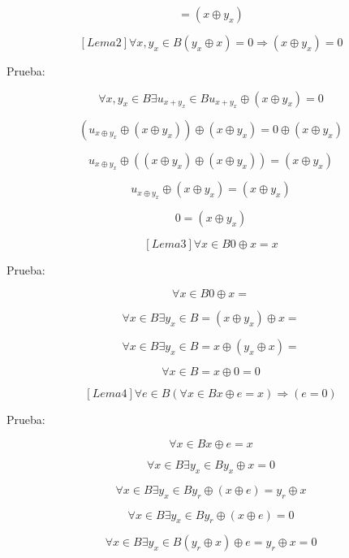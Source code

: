 \documentclass[
]{article}
\begin{document}
\begin{enumerate}
\begin{enumerate}
\begin{enumerate}
      \[= \left( {x \oplus y_{x}} \right)\]

      \[\left\lbrack {{Lema}2} \right\rbrack\forall x,{y_{x} \in B}{\left( {y_{x} \oplus x} \right) = 0}\Rightarrow{\left( {x \oplus y_{x}} \right) = 0}\]

      Prueba:

      \[\forall x,{y_{x} \in B}\exists{u_{x + y_{x}} \in B}{{u_{x + y_{x}} \oplus \left( {x \oplus y_{x}} \right)} = 0}\]

      \[\left( {u_{x \oplus y_{x}} \oplus \left( {x \oplus y_{x}} \right)} \right) \oplus {\left( {x \oplus y_{x}} \right) = 0} \oplus \left( {x \oplus y_{x}} \right)\]

      \[u_{x \oplus y_{x}} \oplus {\left( {\left( {x \oplus y_{x}} \right) \oplus \left( {x \oplus y_{x}} \right)} \right) = \left( {x \oplus y_{x}} \right)}\]

      \[u_{x \oplus y_{x}} \oplus {\left( {x \oplus y_{x}} \right) = \left( {x \oplus y_{x}} \right)}\]

      \[0 = \left( {x \oplus y_{x}} \right)\]

      \[\left\lbrack {{Lema}3} \right\rbrack\forall{x \in B}0 \oplus {x = x}\]

      Prueba:

      \[\forall{x \in B}0 \oplus {x =}\]

      \[\forall{x \in B}\exists{y_{x} \in B}{= \left( {x \oplus y_{x}} \right)} \oplus {x =}\]

      \[\forall{x \in B}\exists{y_{x} \in B}{= x} \oplus {\left( {y_{x} \oplus x} \right) =}\]

      \[\forall{x \in B}{= x} \oplus {0 = 0}\]

      \[\left\lbrack {{Lema}4} \right\rbrack\forall{e \in B}\left( {\forall{x \in B}x \oplus {e = x}} \right)\Rightarrow\left( {e = 0} \right)\]

      Prueba:

      \[\forall{x \in B}x \oplus {e = x}\]

      \[\forall{x \in B}\exists{y_{x} \in B}y_{x} \oplus {x = 0}\]

      \[\forall{x \in B}\exists{y_{x} \in B}y_{r} \oplus {\left( {x \oplus e} \right) = y_{r}} \oplus x\]

      \[\forall{x \in B}\exists{y_{x} \in B}y_{r} \oplus {\left( {x \oplus e} \right) = 0}\]

      \[\forall{x \in B}\exists{y_{x} \in B}\left( {y_{r} \oplus x} \right) \oplus {e = y_{r}} \oplus {x = 0}\]


\end{enumerate}
\end{enumerate}
\end{enumerate}
\end{document}
